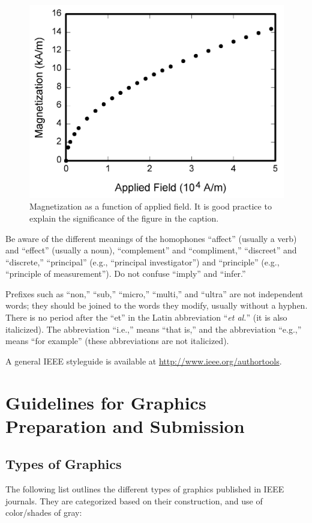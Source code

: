 \documentclass[journal,twoside,web]{ieeecolor2}
\begin{document}
\begin{figure}[!t]
\centerline{\includegraphics[width=\columnwidth]{fig1.png}}
\caption{Magnetization as a function of applied field.
It is good practice to explain the significance of the figure in the caption.}
\label{fig1}
\end{figure}

Be aware of the different meanings of the homophones ``affect'' (usually a 
verb) and ``effect'' (usually a noun), ``complement'' and ``compliment,'' 
``discreet'' and ``discrete,'' ``principal'' (e.g., ``principal 
investigator'') and ``principle'' (e.g., ``principle of measurement'').
Do 
not confuse ``imply'' and ``infer.'' 

Prefixes such as ``non,'' ``sub,'' ``micro,'' ``multi,'' and ``ultra'' are 
not independent words; they should be joined to the words they modify, 
usually without a hyphen.
There is no period after the ``et'' in the Latin 
abbreviation ``\emph{et al.}'' (it is also italicized).
The abbreviation ``i.e.,'' means 
``that is,'' and the abbreviation ``e.g.,'' means ``for example'' (these 
abbreviations are not italicized).

A general IEEE styleguide is available at \underline{http://www.ieee.org/authortools}.

\section{Guidelines for Graphics Preparation and Submission}
\label{sec:guidelines}

\subsection{Types of Graphics}
The following list outlines the different types of graphics published in 
IEEE journals.
They are categorized based on their construction, and use of 
color/shades of gray:
\end{document}

